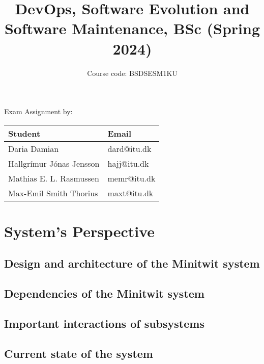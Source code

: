 \documentclass[12pt, a4paper, oneside]{book}
\title{DevOps, Software Evolution and Software Maintenance, BSc (Spring 2024)}
\author{Course code: BSDSESM1KU}
\begin{document}
\begin{minipage}{\textwidth}
\maketitle

\begin{center}
    Exam Assignment by: \\
    \hfill \break
    \bgroup
    \def\arraystretch{1.5}%
    \begin{tabularx}{0.8\textwidth} { 
      | >{\centering\arraybackslash}X 
      | >{\centering\arraybackslash}X | }
     \hline
     \cellcolor[HTML]{EFEFEF} Student & \cellcolor[HTML]{EFEFEF} Email \\
     \hline
     Daria Damian & dard@itu.dk \\
     \hline
     Hallgrímur Jónas Jensson & hajj@itu.dk \\
    \hline
     Mathias E. L. Rasmussen & memr@itu.dk \\
    \hline
     Max-Emil Smith Thorius & maxt@itu.dk \\
    \hline
    \end{tabularx}
    \egroup
\end{center}
\end{minipage}

\tableofcontents

\chapter{System's Perspective}

\section{Design and architecture of the Minitwit system}

\section{Dependencies of the Minitwit system}

\section{Important interactions of subsystems}

\section{Current state of the system}
\end{document}
